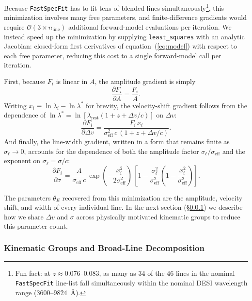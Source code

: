 \documentclass[modern,linenumbers]{aastex701}
\newcommand{\fastspecfit}{\texttt{FastSpecFit}}
\begin{document}
Because \fastspecfit{} has to fit tens of blended lines
simultaneously\footnote{Fun fact: at $z \approx 0.076$–$0.083$, as
many as 34 of the 46 lines in the nominal \fastspecfit{} line-list
fall simultaneously within the nominal DESI wavelength range
(3600–9824~\AA).}, this minimization involves many free parameters,
and finite-difference gradients would require $\mathcal{O}(3\times
n_\mathrm{line})$ additional forward-model evaluations per
iteration. We instead speed up the minimization by supplying
\texttt{least\_squares} with an analytic Jacobian: closed-form first
derivatives of equation~(\ref{eq:model}) with respect to each free
parameter, reducing this cost to a single forward-model call per
iteration.

First, because $F_i$ is linear in $A$, the amplitude gradient is
simply
\begin{equation}
  \frac{\partial F_i}{\partial A} = \frac{F_i}{A}.
  \label{eq:dF_dA}
\end{equation}
Writing $x_i \equiv \ln\lambda_i - \ln\lambda^*$ for brevity, the
velocity-shift gradient follows from the dependence of
$\ln\lambda^* = \ln[\lambda_\mathrm{rest}(1 + z + \Delta v/c)]$ on
$\Delta v$:
\begin{equation}
  \frac{\partial F_i}{\partial \Delta v}
  =
  \frac{F_i\,x_i}{\sigma_\mathrm{eff}^2\,c\,(1+z+\Delta v/c)}.
  \label{eq:dF_dv}
\end{equation}
And finally, the line-width gradient, written in a form that remains
finite as $\sigma_\ell\to0$, accounts for the dependence of both the
amplitude factor $\sigma_\ell/\sigma_\mathrm{eff}$ and the exponent on
$\sigma_\ell = \sigma/c$:
\begin{equation}
  \frac{\partial F_i}{\partial \sigma} =
  \frac{A}{\sigma_\mathrm{eff}\,c}\,
  \exp\!\left(-\frac{x_i^2}{2\sigma_\mathrm{eff}^2} \right) \, \left[1
    - \frac{\sigma_\ell^2}{\sigma_\mathrm{eff}^2} \left(1 -
    \frac{x_i^2}{\sigma_\mathrm{eff}^2} \right)\right].
  \label{eq:dF_ds}
\end{equation}

The parameters $\theta_E$ recovered from this minimization are the
amplitude, velocity shift, and width of every individual line. In the
next section (\S\ref{sssec:kinematic}) we describe how we share
$\Delta v$ and $\sigma$ across physically motivated kinematic groups
to reduce this parameter count.

\subsubsection{Kinematic Groups and Broad-Line Decomposition}
\label{sssec:kinematic}
\end{document}
